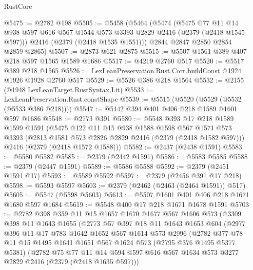 \begin{lexlean}{RustCore}
\begin{coremodule}
@5475 := @2782 @198
@5505 := @5458
    (@5464
      (@5474
        (@5475
          @77
          @11
          @14
          @938
          @597
          @616
          @567
          @1544
          @573
          @3393
          @2829
          @2416
          (@2379 (@2418 @1545 @597)))
        @2416
        (@2379 (@2418 @1535 @1551)))
      @2844
      @2847
      @2850
      @2854
      @2859
      @2865)
@5507 := @2873 @621 @2875
@5515 := @5507 @1561 @389 @407 @218 @597 @1565 @1589 @1686
@5517 := @4219 @2760 @517
@5520 := @5517 @389 @218 @1565
@5526 := LexLeanPreservation.Rust.Corr.buildConst @1924 @1926 @1928 @2760 @517
@5529 := @5526 @386 @218 @1564
@5532 := @2155 (@1948 LexLeanTarget.RustSyntax.Lit)
@5533 := LexLeanPreservation.Rust.constShape
@5539 := @5515 (@5520 (@5529 (@5532 (@5533 @386 @218))))
@5547 := @5442 @394 @401 @406 @218 @1589 @1601 @597 @1686
@5548 := @2773 @391
@5580 := @5548
    @393
    @17
    @218
    @1589
    @1599
    @1591
    (@5475
      @122
      @11
      @15
      @938
      @1588
      @1598
      @567
      @1571
      @573
      @3393
      (@2813 @1581 @573 @2826 @2829 @2416 (@2379 (@2418 @1582 @597)))
      @2416
      (@2379 (@2418 @1572 @1588)))
@5582 := @2437 (@2438 @1591)
@5583 := @5580 @5582
@5585 := @2379 (@2442 @1591)
@5586 := @5583 @5585
@5588 := @2379 (@2447 @1591)
@5589 := @5586 @5588
@5592 := @2379 (@2451 @1591 @17)
@5593 := @5589 @5592
@5597 := @2379 (@2456 @391 @17 @218)
@5598 := @5593 @5597
@5603 := @2379 (@2462 (@2463 (@2464 @1591)) @517)
@5605 := @5547 (@5598 @5603)
@5613 := @5507 @1601 @401 @406 @218 @1671 @1680 @597 @1684
@5619 := @5548 @400 @17 @218 @1671 @1678 @1591
@5703 := @2782
    @398
    @359
    @11
    @15
    @1657
    @1670
    @1677
    @567
    @1606
    @573
    (@3309
      @398
      @11
      @1643
      @1655
      (@2773
        @57
        @397
        @18
        @11
        @1643
        @1653
        @604
        (@2977
          @396
          @11
          @17
          @783
          @1642
          @1652
          @567
          @1614
          @573
          @2996
          (@2782
            @377
            @78
            @11
            @15
            @1495
            @1641
            @1651
            @567
            @1624
            @573
            (@2795 @376 @1495 @5377 @5381)
            (@2782
              @75
              @77
              @11
              @14
              @594
              @597
              @616
              @567
              @1634
              @573
              @3277
              @2829
              @2416
              (@2379 (@2418 @1635 @597)))

\end{coremodule}
\end{lexlean}
